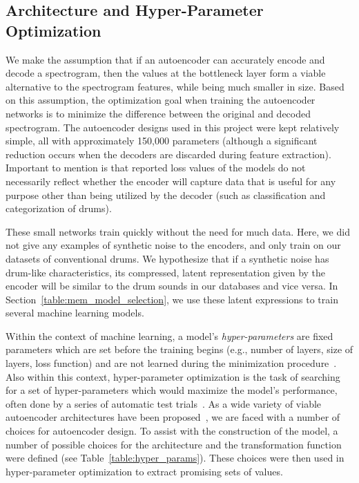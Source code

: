 \documentclass[\main/thesis.tex]{subfiles}
\begin{document}
\subsection{Architecture and Hyper-Parameter Optimization}
We make the assumption that if an autoencoder can accurately encode and decode a spectrogram, then the values at the bottleneck layer form a viable alternative to the spectrogram features, while being much smaller in size. Based on this assumption, the optimization goal when training the autoencoder networks is to minimize the difference between the original and decoded spectrogram.  The autoencoder designs used in this project were kept relatively simple, all with approximately 150,000 parameters (although a significant reduction occurs when the decoders are discarded during feature extraction). Important to mention is that reported loss values of the models do not necessarily reflect whether the encoder will capture data that is useful for any purpose other than being utilized by the decoder (such as classification and categorization of drums). 

These small networks train quickly without the need for much data. Here, we did not give any examples of synthetic noise to the encoders, and only train on our datasets of conventional drums. We hypothesize that if a synthetic noise has drum-like characteristics, its compressed, latent representation given by the encoder will be similar to the drum sounds in our databases and vice versa. In Section~\ref{table:mem_model_selection}, we use these latent expressions to train several machine learning models.

Within the context of machine learning, a model's \emph{hyper-parameters} are fixed parameters which are set before the training begins (e.g., number of layers, size of layers, loss function) and are not learned during the minimization procedure~\cite{bengio2000gradient}. Also within this context, hyper-parameter optimization is the task of searching for a set of hyper-parameters which would maximize the model's performance, often done by a series of automatic test trials~\cite{bengio2000gradient,bergstra2011algorithms,bergstra2012random}. As a wide variety of viable autoencoder architectures have been proposed~\cite{aouameur2019neural,esling2018generative,gensler2016deep,zhang2016facing,pu2016variational}, we are faced with a number of choices for autoencoder design. To assist with the construction of the model, a number of possible choices for the architecture and the transformation function were defined (see Table~\ref{table:hyper_params}). These choices were then used in hyper-parameter optimization to extract promising sets of values. 
\end{document}
